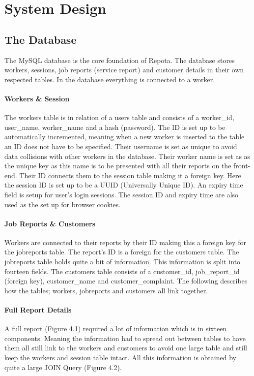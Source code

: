 \chapter{System Design}
\section{The Database}
The MySQL database is the core foundation of Repota. The database stores workers, sessions, job reports (service report) and customer details in their own respected tables. In the database everything is connected to a worker. 

\subsubsection{Workers \& Session}
The workers table is in relation of a users table and consists of a worker\_id, user\_name, worker\_name and a hash (password). The ID is set up to be automatically incremented, meaning when a new worker is inserted to the table an ID does not have to be specified. Their username is set as unique to avoid data collisions with other workers in the database. Their worker name is set as as the unique key as this name is to be presented with all their reports on the front-end. Their ID connects them to the session table making it a foreign key. Here the session ID is set up to be a UUID (Universally Unique ID). An expiry time field is setup for user's login sessions. The session ID and expiry time are also used as the set up for browser cookies.

\subsubsection{Job Reports \& Customers}
Workers are connected to their reports by their ID making this a foreign key for the jobreports table. The report's ID is a foreign for the customers table. The jobreports table holds quite a bit of information. This information is split into fourteen fields. The customers table consists of a customer\_id, job\_report\_id (foreign key), customer\_name and customer\_complaint.  The following describes how the tables; workers, jobreports and customers all link together. 
 \newpage
\subsubsection{Full Report Details}
A full report (Figure 4.1) required a lot of information which is in sixteen components. Meaning the information had to spread out between tables to have them all still link to the workers and customers to avoid one large table and still keep the workers and session table intact. All this information is obtained by quite a large JOIN Query (Figure 4.2).

